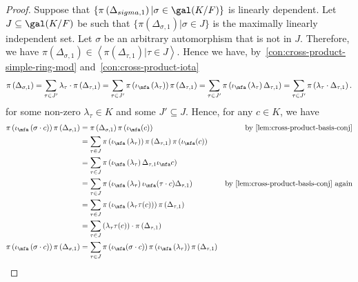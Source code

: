 \begin{proof}
  Suppose that $\{\pi\left(\Delta_{sigma, 1}\right)|\sigma\in\gal(K/F)\}$ is linearly dependent. Let $J \subseteq \gal(K/F)$ be such that $\{\pi\left(\Delta_{\sigma, 1}\right)|\sigma\in J\}$ is the maximally linearly independent set. Let $\sigma$ be an arbitrary automorphism that is not in $J$. Therefore, we have $\pi\left(\Delta_{\sigma, 1}\right) \in \left\langle \pi\left(\Delta_{\tau, 1}\right) | \tau\in J \right\rangle$. Hence we have, by~\cref{con:cross-product-simple-ring-mod} and~\cref{con:cross-product-iota}
  \[
    \pi\left(\Delta_{\sigma,1}\right) = \sum_{\tau\in J'}\lambda_{\tau}\cdot\pi\left(\Delta_{\tau, 1}\right) = \sum_{\tau\in J'}\pi\left(\iota_{\mfa}\left(\lambda_{\tau}\right)\right)\pi\left(\Delta_{\tau, 1}\right) = \sum_{\tau\in J'}\pi\left(\iota_{\mfa}\left(\lambda_{\tau}\right)\Delta_{\tau,1}\right) =\sum_{\tau\in J'}\pi\left(\lambda_{\tau}\cdot \Delta_{\tau, 1}\right).
  \]
  for some non-zero $\lambda_{\tau} \in K$ and some $J' \subseteq J$.
  Hence, for any $c \in K$, we have
  \[
    \begin{aligned}
      \pi\left(\iota_{\mfa}\left(\sigma \cdot c\right)\right) \pi\left(\Delta_{\sigma, 1}\right)
      &= \pi\left(\Delta_{\sigma, 1}\right)\pi\left(\iota_{\mfa}(c)\right) &\text{by~\cref{lem:cross-product-basis-conj}} \\
      &= \sum_{\tau\in J}
        \pi\left(\iota_{\mfa}\left(\lambda_{\tau}\right)\right)
        \pi\left(\Delta_{\tau, 1}\right)
        \pi\left(\iota_{\mfa}(c)\right)\\
      &= \sum_{\tau\in J}
        \pi\left(
        \iota_{\mfa}\left(\lambda_{\tau}\right)\Delta_{\tau, 1} \iota_{\mfa} c
        \right) \\
      &= \sum_{\tau\in J}
        \pi\left(
        \iota_{\mfa}\left(\lambda_{\tau}\right)\iota_{\mfa}(\tau\cdot c)\Delta_{\tau, 1}
        \right) & \text{by~\cref{lem:cross-product-basis-conj} again}\\
      &= \sum_{\tau\in J}
        \pi\left(\iota_{\mfa}\left(\lambda_{\tau}\tau(c)\right)\right)
        \pi\left(\Delta_{\tau,1}\right)\\
      &= \sum_{\tau\in J}
        \left(\lambda_{\tau}\tau(c)\right)\cdot \pi\left(\Delta_{\tau, 1}\right)\\
      \pi\left(\iota_{\mfa}\left(\sigma \cdot c\right)\right) \pi\left(\Delta_{\sigma, 1}\right)
      &= \sum_{\tau\in J}
        \pi\left(\iota_{\mfa}(\sigma\cdot c)\right)
        \pi\left(\iota_{\mfa}\left(\lambda_{\tau}\right)\right)
        \pi\left(\Delta_{\tau, 1}\right) \\

\end{aligned}\]
\end{proof}
